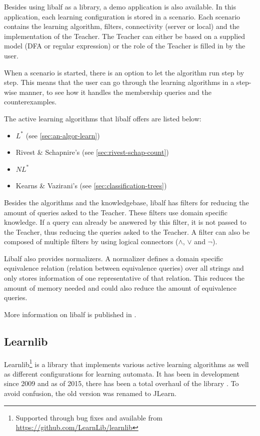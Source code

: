 Besides using libalf as a library, a demo application is also available. In 
this application, each learning configuration is stored in a scenario. Each 
scenario contains the learning algorithm, filters, connectivity (server or 
local) and the implementation of the Teacher. The Teacher can either be 
based on a supplied model (DFA or regular expression) or the role of the 
Teacher is filled in by the user. 

When a scenario is started, there is an option to let the algorithm run 
step by step. This means that the user can go through the learning algorithms 
in a step-wise manner, to see how it handles the membership queries and the 
counterexamples. 

The active learning algorithms that libalf offers are listed below:

\begin{itemize}
	\item $L^*$ (see \cref{sec:an-algor-learn})
	\item Rivest \& Schapnire's (see \cref{sec:rivest-schap-count})
	\item $NL^*$ \cite{Bollig2009}
	\item Kearns \& Vazirani's (see \cref{sec:classification-trees})
\end{itemize}

Besides the algorithms and the knowledgebase, libalf has filters for reducing 
the amount of queries asked to the Teacher. These filters use domain specific 
knowledge. If a query can already be answered by this filter, it is not passed 
to the Teacher, thus reducing the queries asked to the Teacher. A filter can 
also be composed of multiple filters by using logical connectors ($\land$, 
$\lor$ and $\lnot$).

Libalf also provides normalizers. A normalizer defines a domain specific 
equivalence relation (relation between equivalence queries) over all strings 
and only stores information of one representative of that relation. This 
reduces the amount of memory needed and could also reduce the amount of 
equivalence queries.

More information on libalf is published in \cite{Bollig2010}.

\subsection{Learnlib}
\label{ssec:learnlib}

Learnlib\footnote{Supported through bug fixes and available from
\url{https://github.com/LearnLib/learnlib}} is a library that implements various
active learning algorithms as well as different configurations for learning
automata. It has been in development since 2009 \cite{Raffelt2009} and as of
2015, there has been a total overhaul of the library \cite{Isberner2015b}. To
avoid confusion, the old version was renamed to JLearn.

